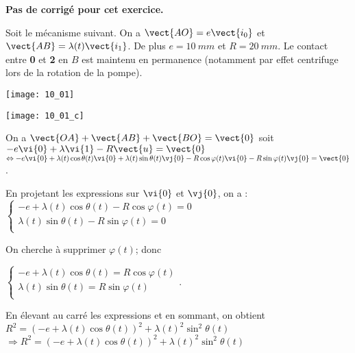 \normaltrue \difficilefalse \tdifficilefalse
\correctiontrue
\newcommand{\UPSTIidClasse}{12}

\setcounter{numques}{0}
\ifcorrection
\else
\textbf{Pas de corrigé pour cet exercice.}
\fi

\ifprof
\else
Soit le mécanisme suivant. On a $\vect{AO}=e\vect{i_0}$ et $\vect{AB}=\lambda(t)\vect{i_1}$. De plus $e=\SI{10}{mm}$ et $R=\SI{20}{mm}$. Le contact entre \textbf{0} et \textbf{2} en $B$ est maintenu en permanence (notamment par effet centrifuge lors de la rotation de la pompe).
\begin{center}
\texttt{[image: 10\_01]}
\end{center}
\fi



\ifprof
\begin{center}
\texttt{[image: 10\_01\_c]}
\end{center}
\else
\fi


\ifprof
On a $\vect{OA}+\vect{AB}+\vect{BO}=\vect{0}$
soit $-e\vi{0}+\lambda\vi{1}-R\vect{u}=\vect{0}$
$\Leftrightarrow -e\vi{0}+\lambda(t)\cos\theta(t)\vi{0}+\lambda(t)\sin\theta(t)\vj{0}-R\cos\varphi(t)\vi{0}-R\sin\varphi(t)\vj{0} = \vect{0}$.

En projetant les expressions sur $\vi{0}$ et $\vj{0}$, on a :
$\left\{
\begin{array}{l}
-e+\lambda(t)\cos\theta(t)-R\cos\varphi(t) = 0 \\
\lambda(t)\sin\theta(t)-R\sin\varphi(t) = 0 \\
\end{array}\right.
$

On cherche à supprimer $\varphi(t)$; donc 

$\left\{
\begin{array}{l}
-e+\lambda(t)\cos\theta(t)=R\cos\varphi(t)  \\
\lambda(t)\sin\theta(t)  = R\sin\varphi(t) \\
\end{array}\right.
$.

En élevant au carré les expressions et en sommant, on obtient 
$R^2 =\left(-e+\lambda(t)\cos\theta(t)\right)^2+\lambda(t)^2\sin^2\theta(t)$
$\Rightarrow R^2 =\left(-e+\lambda(t)\cos\theta(t)\right)^2+\lambda(t)^2\sin^2\theta(t)$

